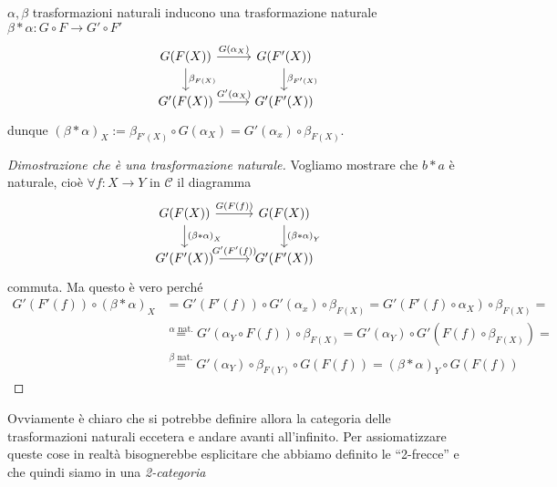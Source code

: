\begin{proposition}{}
\(\alpha, \beta\) trasformazioni naturali inducono una trasformazione naturale
\(\beta * \alpha : G \circ F \to G' \circ F'\) 
\[\begin{tikzcd}
	{G{(F{(X)})}} & {G{(F'{(X)})}} \\
    {G'{(F{(X)})}} & {G'{(F'{(X)})}}
	\arrow["G{(\alpha_X)}", from=1-1, to=1-2]
	\arrow["\beta_{F{(X)}}  ", from=1-1, to=2-1]
	\arrow["\beta_{F'{(X)}} ", from=1-2, to=2-2]
	\arrow["G'{(\alpha_X)}", from=2-1, to=2-2]
\end{tikzcd}\]
dunque \((\beta * \alpha)_X := \beta_{F'{(X)}} \circ G{(\alpha_X)} = G'{(\alpha_x)} \circ \beta_{F{(X)}} \).
\end{proposition}
\begin{proof}[Dimostrazione che è una trasformazione naturale]
Vogliamo mostrare che \(b * a\) è naturale, cioè \(\forall f : X \to Y\) in \(\mathcal{C}\) il diagramma
\[\begin{tikzcd}
	{G{(F{(X)})}} & {G{(F{(X)})}} \\
    {G'{(F'{(X)})}} & {G'{(F'{(X)})}}
	\arrow["G{(F{(f)})}", from=1-1, to=1-2]
	\arrow["{(\beta * \alpha)}_X", from=1-1, to=2-1]
	\arrow["{(\beta * \alpha)}_Y", from=1-2, to=2-2]
	\arrow["G'{(F'{(f)})}", from=2-1, to=2-2]
\end{tikzcd}\]
commuta. Ma questo è vero perché
\begin{align*}
    G'{(F'{(f)})} \circ {(\beta * \alpha)}_X &= G'{(F'{(f)})} \circ G'{(\alpha_x)}
  \circ \beta_{F{(X)}} = G'{(F'{(f)} \circ \alpha_X)} \circ \beta_{F{(X)}} = \\
    &\overset{\alpha \text{ nat.}}{=} G'{(\alpha_Y \circ F{(f)})} \circ
    \beta_{F{(X)}} = G'{(\alpha_Y)} \circ G'{(F{(f)} \circ \beta_{F{(X)}})} = \\
    &\overset{\beta \text{ nat.}}{=} G'{(\alpha_Y)} \circ \beta_{F{(Y)}}
    \circ G{(F{(f)})} = {(\beta * \alpha)}_Y \circ G{(F{(f)})}
\end{align*}
\end{proof}

Ovviamente è chiaro che si potrebbe definire allora la categoria delle
trasformazioni naturali eccetera e andare avanti all'infinito. Per
assiomatizzare queste cose in realtà bisognerebbe esplicitare che abbiamo
definito le ``2-frecce'' e che quindi siamo in una \emph{2-categoria}

